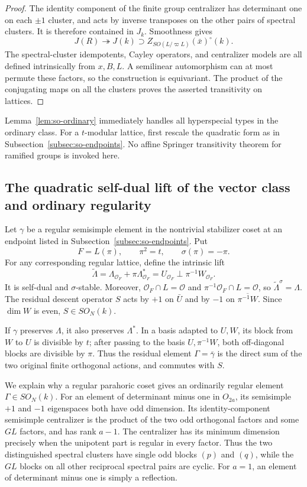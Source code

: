 \documentclass[11pt,a4paper]{article}
\theoremstyle{definition}
\theoremstyle{remark}
\begin{document}
\begin{proof}
The identity component of the finite group centralizer has
determinant one on each \(\pm1\) cluster, and acts by inverse
transposes on the other pairs of spectral clusters. It is
therefore contained in \(J_k\). Smoothness gives
\[
 J(R)\twoheadrightarrow J(k)
       \supset Z_{SO(L/\varpi L)}(\bar x)^\circ(k).
\]
The spectral-cluster idempotents, Cayley operators, and centralizer
models are all defined intrinsically from \(x,B,L\). A semilinear
automorphism can at most permute these factors, so the construction
is equivariant. The product of the conjugating maps on all the
clusters proves the asserted transitivity on lattices.
\end{proof}

Lemma~\ref{lem:so-ordinary} immediately handles all hyperspecial
types in the ordinary class. For a \(t\)-modular lattice, first
rescale the quadratic form as in
Subsection~\ref{subsec:so-endpoints}. No affine Springer transitivity
theorem for ramified groups is invoked here.

\subsection{The quadratic self-dual lift of the vector class and ordinary regularity}
\label{subsec:so-quadratic-lift}

Let \(\gamma\) be a regular semisimple element in the nontrivial
stabilizer coset at an endpoint listed in
Subsection~\ref{subsec:so-endpoints}. Put
\[
 F=L(\pi),\qquad \pi^2=t,\qquad \sigma(\pi)=-\pi.
\]
For any corresponding regular lattice, define the intrinsic lift
\[
 \widetilde\Lambda
 =\Lambda_{\mathcal O_F}+\pi\Lambda^*_{\mathcal O_F}
 =U_{\mathcal O_F}\perp\pi^{-1}W_{\mathcal O_F}.
\]
It is self-dual and \(\sigma\)-stable. Moreover,
\(\mathcal O_F\cap L=\mathcal O\) and
\(\pi^{-1}\mathcal O_F\cap L=\mathcal O\), so
\(\widetilde\Lambda^\sigma=\Lambda\). The residual descent
operator \(S\) acts by \(+1\) on \(\bar U\) and by \(-1\) on
\(\overline{\pi^{-1}W}\). Since \(\dim W\) is even,
\(S\in SO_N(k)\).

If \(\gamma\) preserves \(\Lambda\), it also preserves
\(\Lambda^*\). In a basis adapted to \(U,W\), its block from \(W\)
to \(U\) is divisible by \(t\); after passing to the basis
\(U,\pi^{-1}W\), both off-diagonal blocks are divisible by \(\pi\).
Thus the residual element \(\Gamma=\bar\gamma\) is the direct sum
of the two original finite orthogonal actions, and commutes with
\(S\).

We explain why a regular parahoric coset gives an ordinarily
regular element \(\Gamma\in SO_N(k)\). For an element of
determinant minus one in \(O_{2a}\), its semisimple \(+1\) and
\(-1\) eigenspaces both have odd dimension. Its
identity-component semisimple centralizer is the product of the
two odd orthogonal factors and some \(GL\) factors, and has rank
\(a-1\). The centralizer has its minimum dimension precisely when
the unipotent part is regular in every factor. Thus the two
distinguished spectral clusters have single odd blocks
\((p)\) and \((q)\), while the \(GL\) blocks on all other
reciprocal spectral pairs are cyclic. For \(a=1\), an element
of determinant minus one is simply a reflection.
\end{document}

